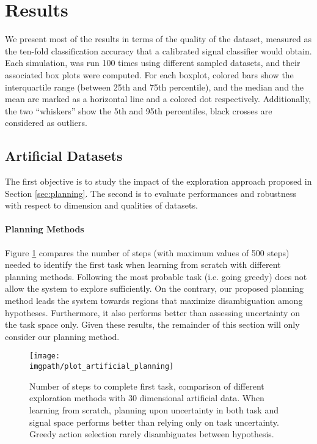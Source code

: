 \section{Results}


We present most of the results in terms of the quality of the dataset, measured as the ten-fold classification accuracy that a calibrated signal classifier would obtain. Each simulation, was run 100 times using different sampled datasets, and their associated box plots \cite{mcgill1978variations} were computed. For each boxplot, colored bars show the interquartile range (between 25th and 75th percentile), and the median and the mean are marked as a horizontal line and a colored dot respectively. Additionally, the two ``whiskers'' show the 5th and 95th percentiles, black crosses are considered as outliers. 


\subsection{Artificial Datasets}
The first objective is to study the impact of the exploration approach proposed in Section \ref{sec:planning}. The second is to evaluate performances and robustness with respect to dimension and qualities of datasets. 

\paragraph{Planning Methods}
Figure \ref{fig:planning} compares the number of steps (with maximum values of 500 steps) needed to identify the first task when learning from scratch with different planning methods. Following the most probable task (i.e. going greedy) does not allow the system to explore sufficiently. On the contrary, our proposed planning method leads the system towards regions that maximize disambiguation among hypotheses. Furthermore, it also performs better than assessing uncertainty on the task space only. Given these results, the remainder of this section will only consider our planning method.

\begin{figure}[!h]
  \centering
      \texttt{[image: \\imgpath/plot\_artificial\_planning]}
      \caption{Number of steps to complete first task, comparison of different exploration methods with 30 dimensional artificial data. When learning from scratch, planning upon uncertainty in both task and signal space performs better than relying only on task uncertainty. Greedy action selection rarely disambiguates between hypothesis.}
    \label{fig:planning}
\end{figure}


